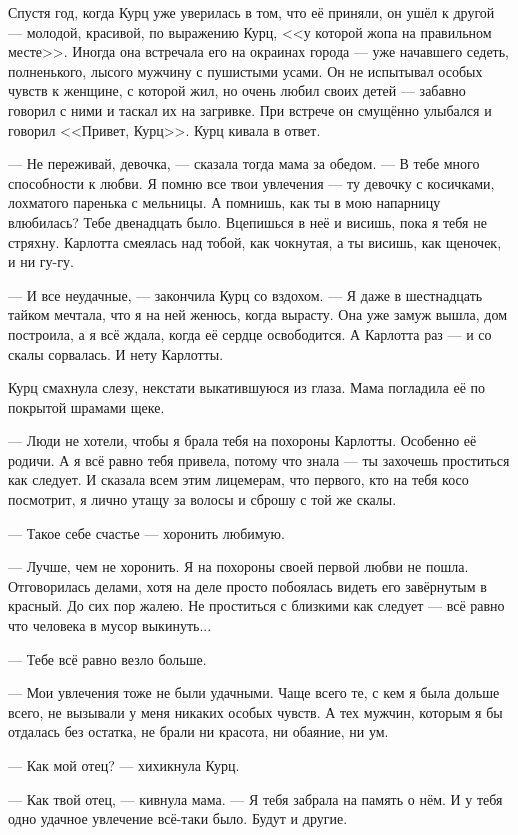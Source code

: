 \documentclass[a4paper,10pt,fleqn]{book}\usepackage{polyglossia}\setdefaultlanguage{english}\setotherlanguage{russian}\defaultfontfeatures{Ligatures=TeX,Mapping=tex-text}\usepackage{xcolor}\definecolor{lightgray}{HTML}{bbbbbb}\color{lightgray}\newcommand{\ml}[3]{\textcolor{black}{#3}}
\begin{document}
Спустя год, когда Курц уже уверилась в том, что её приняли, он ушёл к другой --- молодой, красивой, по выражению Курц, <<у которой жопа на правильном месте>>.
Иногда она встречала его на окраинах города --- уже начавшего седеть, полненького, лысого мужчину с пушистыми усами.
Он не испытывал особых чувств к женщине, с которой жил, но очень любил своих детей --- забавно говорил с ними и таскал их на загривке.
При встрече он смущённо улыбался и говорил <<Привет, Курц>>.
Курц кивала в ответ.

--- Не переживай, девочка, --- сказала тогда мама за обедом.
--- В тебе много способности к любви.
Я помню все твои увлечения --- ту девочку с косичками, лохматого паренька с мельницы.
А помнишь, как ты в мою напарницу влюбилась?
Тебе двенадцать было.
Вцепишься в неё и висишь, пока я тебя не стряхну.
Карлотта смеялась над тобой, как чокнутая, а ты висишь, как щеночек, и ни гу-гу.

--- И все неудачные, --- закончила Курц со вздохом.
--- Я даже в шестнадцать тайком мечтала, что я на ней женюсь, когда вырасту.
Она уже замуж вышла, дом построила, а я всё ждала, когда её сердце освободится.
А Карлотта раз --- и со скалы сорвалась.
И нету Карлотты.

Курц смахнула слезу, некстати выкатившуюся из глаза.
Мама погладила её по покрытой шрамами щеке.

--- Люди не хотели, чтобы я брала тебя на похороны Карлотты.
Особенно её родичи.
А я всё равно тебя привела, потому что знала --- ты захочешь проститься как следует.
И сказала всем этим лицемерам, что первого, кто на тебя косо посмотрит, я лично утащу за волосы и сброшу с той же скалы.

--- Такое себе счастье --- хоронить любимую.

--- Лучше, чем не хоронить.
Я на похороны своей первой любви не пошла.
Отговорилась делами, хотя на деле просто побоялась видеть его завёрнутым в красный.
До сих пор жалею.
Не проститься с близкими как следует --- всё равно что человека в мусор выкинуть...

--- Тебе всё равно везло больше.

--- Мои увлечения тоже не были удачными.
Чаще всего те, с кем я была дольше всего, не вызывали у меня никаких особых чувств.
А тех мужчин, которым я бы отдалась без остатка, не брали ни красота, ни обаяние, ни ум.

--- Как мой отец? --- хихикнула Курц.

--- Как твой отец, --- кивнула мама.
--- Я тебя забрала на память о нём.
И у тебя одно удачное увлечение всё-таки было.
Будут и другие.
\end{document}
